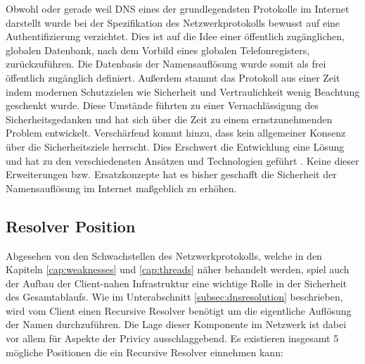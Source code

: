 Obwohl oder gerade weil DNS eines der grundlegendsten Protokolle im Internet darstellt wurde bei der Spezifikation des Netzwerkprotokolls bewusst auf eine Authentifizierung verzichtet. Dies ist auf die Idee einer öffentlich zugänglichen, globalen Datenbank, nach dem Vorbild eines globalen Telefonregisters, zurückzuführen. Die Datenbasis der Namensauflösung wurde somit als frei öffentlich zugänglich definiert. Außerdem stammt das Protokoll aus einer Zeit indem modernen Schutzzielen wie Sicherheit und Vertraulichkeit wenig Beachtung geschenkt wurde. Diese Umstände führten zu einer Vernachlässigung des Sicherheitsgedanken und hat sich über die Zeit zu einem ernstzunehmenden Problem entwickelt. Verschärfend kommt hinzu, dass kein allgemeiner Konsenz über die Sicherheitsziele herrscht. Dies Erschwert die Entwicklung eine Lösung und hat zu den verschiedensten Ansätzen und Technologien geführt \cite{Grothoff2018}. Keine dieser Erweiterungen bzw. Ersatzkonzepte hat es bisher geschafft die Sicherheit der Namensauflösung im Internet maßgeblich zu erhöhen. 

\subsection{Resolver Position}
Abgesehen von den Schwachstellen des Netzwerkprotokolls, welche in den Kapiteln \ref{cap:weaknesses} und \ref{cap:threads} näher behandelt werden, spiel auch der Aufbau der Client-nahen Infrastruktur eine wichtige Rolle in der Sicherheit des Gesamtablaufs. Wie im Unterabschnitt \ref{subsec:dnsresolution} beschrieben, wird vom Client einen Recursive Resolver benötigt um die eigentliche Auflösung der Namen durchzuführen. Die Lage dieser Komponente im Netzwerk ist dabei vor allem für Aspekte der Privicy ausschlaggebend. Es existieren insgesamt 5 mögliche Positionen die ein Recursive Resolver einnehmen kann:





